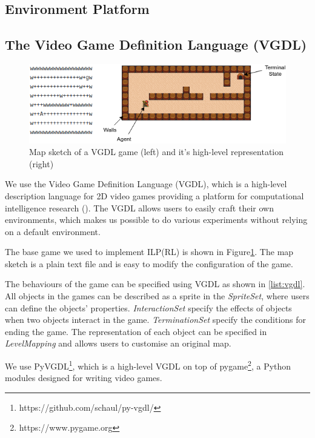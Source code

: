 \subsection{Environment Platform}
\subsection{The Video Game Definition Language (VGDL)}

\begin{figure}[!ht!b]
\centering
\includegraphics[width=1\textwidth]{./figures/env_sample}
\caption{Map sketch of a VGDL game (left) and it's high-level representation (right)} 
\label{VGDL_sample}
\end{figure}

We use the Video Game Definition Language (VGDL), which is a high-level description language for 2D video games providing a platform for computational intelligence research (\cite{Schaul2013}).
The VGDL allows users to easily craft their own environments, 
which makes us possible to do various experiments without relying on a default environment.

The base game we used to implement ILP(RL) is shown in Figure\ref{VGDL_sample}.
The map sketch is a plain text file and is easy to modify the configuration of the game.



The behaviours of the game can be specified using VGDL as shown in \ref{list:vgdl}. 
All objects in the games can be described as a sprite in the \textit{SpriteSet}, where users can define the objects' properties.
\textit{InteractionSet} specify the effects of objects when two objects interact in the game.
\textit{TerminationSet} specify the conditions for ending the game.
The representation of each object can be specified in \textit{LevelMapping} and allows users to customise an original map.

We use PyVGDL\footnote{https://github.com/schaul/py-vgdl/}, which is a high-level VGDL on top of pygame\footnote{https://www.pygame.org}, 
a Python modules designed for writing video games.

